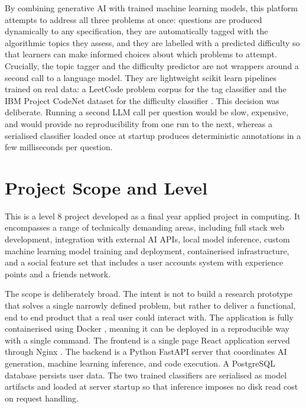 By combining generative AI with trained machine learning models, this
platform attempts to address all three problems at once: questions are
produced dynamically to any specification, they are automatically tagged
with the algorithmic topics they assess, and they are labelled with a
predicted difficulty so that learners can make informed choices about which
problems to attempt. Crucially, the topic tagger and the difficulty predictor
are not wrappers around a second call to a language model. They are
lightweight scikit learn pipelines \cite{pedregosa2011} trained on real data:
a LeetCode problem corpus for the tag classifier \cite{leetcode2025} and the
IBM Project CodeNet dataset for the difficulty classifier \cite{puri2021codenet}.
This decision was deliberate. Running a second LLM call per question would
be slow, expensive, and would provide no reproducibility from one run to the
next, whereas a serialised classifier loaded once at startup produces
deterministic annotations in a few milliseconds per question.

\section{Project Scope and Level}

This is a level 8 project developed as a final year applied project in
computing. It encompasses a range of technically demanding areas, including
full stack web development, integration with external AI APIs, local model
inference, custom machine learning model training and deployment,
containerised infrastructure, and a social feature set that includes a
user accounts system with experience points and a friends network.

The scope is deliberately broad. The intent is not to build a research
prototype that solves a single narrowly defined problem, but rather to
deliver a functional, end to end product that a real user could interact with.
The application is fully containerised using Docker     \cite{merkel2014docker},
meaning it can be deployed in a reproducible way with a single command. The
frontend is a single page React application \cite{react2013} served through
Nginx \cite{nginx2025}. The backend is a Python FastAPI server
\cite{fastapi2025} that coordinates AI generation, machine learning inference,
and code execution. A PostgreSQL database \cite{postgres2025} persists user
data. The two trained classifiers are serialised as model artifacts and
loaded at server startup so that inference imposes no disk read cost on
request handling.

